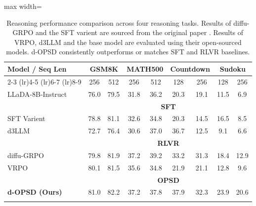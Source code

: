 \documentclass{article}
\begin{document}
\begin{table}[!t]
\centering
\caption{Reasoning performance comparison across four reasoning tasks. Results of diffu-GRPO and the SFT varient are sourced from the original paper \citep{zhao2025d1}. Results of VRPO, d3LLM and the base model are evaluated using their open-sourced models. d-OPSD consistently outperforms or matches SFT and RLVR baselines.}
\begin{threeparttable}
\begin{adjustbox}{max width=\textwidth}
\begin{tabular}{lcccccccc}
\toprule
\multirow{2}{*}{Model / Seq Len} & \multicolumn{2}{c}{GSM8K} & \multicolumn{2}{c}{MATH500} & \multicolumn{2}{c}{Countdown} & \multicolumn{2}{c}{Sudoku} \\
\cmidrule(lr){2-3} \cmidrule(lr){4-5} \cmidrule(lr){6-7} \cmidrule(lr){8-9}
 & 256 & 512 & 256 & 512 & 128 & 256 & 128 & 256 \\
\midrule

LLaDA-8B-Instruct & 76.0 & 79.5 & 31.8 & 36.2 & 20.3 & 19.1 & 11.5 & 6.9 \\
\midrule
& \multicolumn{8}{c}{\textbf{SFT}} \\
SFT Varient \citep{zhao2025d1} & 78.8 & 81.1 & 32.6 & 34.8 & 20.3 & 14.5 & 16.5 & 8.5 \\
d3LLM \citep{qian2026d3llm} & 72.7 & 76.4 & 30.6 & 37.0 & 36.7 & 12.5 & 9.1 & 6.6 \\
\midrule
& \multicolumn{8}{c}{\textbf{RLVR}} \\
diffu-GRPO \citep{zhao2025d1} & 79.8 & 81.9 & 37.2 & \cellcolor{lightblue} 39.2 & 33.2 & 31.3 & 18.4 & 12.9 \\
VRPO \citep{zhu2025llada} & 80.1 & 81.5 & 35.6 & 34.8 & 21.9 & 21.1 & 12.8 & 9.6 \\
\midrule
& \multicolumn{8}{c}{\textbf{OPSD}} \\
\textbf{d-OPSD (Ours)} & \cellcolor{lightblue} 81.0 & \cellcolor{lightblue} 82.2 & \cellcolor{lightblue} 37.2 & 37.8 & \cellcolor{lightblue} 37.9 & \cellcolor{lightblue} 32.3 & \cellcolor{lightblue} 23.9 & \cellcolor{lightblue} 20.6 \\

\bottomrule
\label{tab2}
\end{tabular}
\end{adjustbox}
\end{threeparttable}
\vspace{-20pt}
\end{table}
\end{document}
